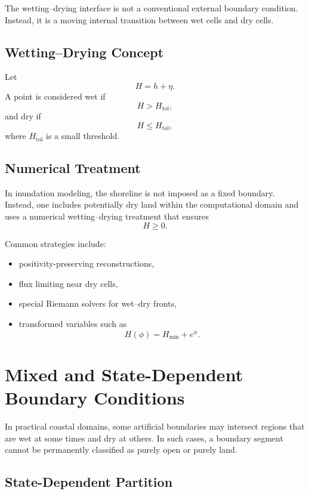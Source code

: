 \documentclass[11pt]{article}
\begin{document}
The wetting--drying interface is not a conventional external boundary condition. Instead, it is a moving internal transition between wet cells and dry cells.

\subsection{Wetting--Drying Concept}

Let
\[
H = h + \eta.
\]
A point is considered wet if
\begin{equation}
H > H_{\mathrm{tol}},
\end{equation}
and dry if
\begin{equation}
H \le H_{\mathrm{tol}},
\end{equation}
where \(H_{\mathrm{tol}}\) is a small threshold.

\subsection{Numerical Treatment}

In inundation modeling, the shoreline is not imposed as a fixed boundary. Instead, one includes potentially dry land within the computational domain and uses a numerical wetting--drying treatment that ensures
\begin{equation}
H \ge 0.
\end{equation}

Common strategies include:
\begin{itemize}[leftmargin=2em]
    \item positivity-preserving reconstructions,
    \item flux limiting near dry cells,
    \item special Riemann solvers for wet--dry fronts,
    \item transformed variables such as
    \[
    H(\phi)=H_{\min}+e^\phi.
    \]
\end{itemize}

\section{Mixed and State-Dependent Boundary Conditions}

In practical coastal domains, some artificial boundaries may intersect regions that are wet at some times and dry at others. In such cases, a boundary segment cannot be permanently classified as purely open or purely land.

\subsection{State-Dependent Partition}
\end{document}
